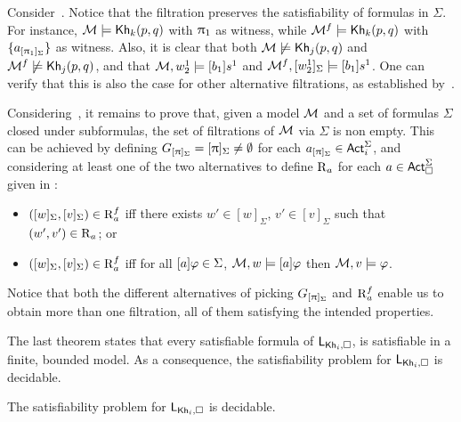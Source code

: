 \medskip 

\begin{example}\label{ex:filtration-preserves}
 Consider~. Notice that the filtration preserves the satisfiability of formulas in $\Sigma$. For instance, $\mathcal{M}\models{\sf Kh}_k(p,q)$ with $\uppi_1$ as witness, while $\mathcal{M}^f\models{\sf Kh}_k(p,q)$ with $\{ a_{[\uppi_1]_\Sigma} \}$ as witness. Also, it is clear that both $\mathcal{M}\not\models{\sf Kh}_j(p,q)$ and $\mathcal{M}^f\not\models{\sf Kh}_j(p,q)$, and that $\mathcal{M},w^1_2\models[b_1] s^1$ and $\mathcal{M}^f,[w^1_2]_\Sigma\models[b_1] s^1$. One can verify that this is also the case for other alternative filtrations, as established by~.
\end{example}

\medskip

Considering~, it remains to prove that, given a model $\mathcal{M}$ and a set of formulas $\Sigma$ closed under subformulas, the set of filtrations of $\mathcal{M}$ via $\Sigma$ is non empty.
This can be achieved by defining $G_{[\uppi]_\Sigma} = [\uppi]_\Sigma \neq \emptyset$ for each $a_{[\uppi]_\Sigma} \in {\rm \sf Act}^\Sigma_i$, and considering at least one of the two alternatives to define $\operatorname{R}_a$ for each $a \in {\rm \sf Act}^\Sigma_\square$ given in \cite{HML,mlbook}:

\begin{itemize}
\item $([w]_\Sigma,[v]_\Sigma) \in \operatorname{R}^f_a$ iff there exists $w' \in [w]_\Sigma$, $v' \in [v]_\Sigma$ such that $(w',v') \in \operatorname{R}_a$; or
\item $([w]_\Sigma,[v]_\Sigma) \in \operatorname{R}^f_a$ iff for all $[a]\varphi \in \Sigma$, $\mathcal{M},w \models [a]\varphi$ then $\mathcal{M},v \models \varphi$.
\end{itemize}

Notice that both the different alternatives of picking $G_{[\uppi]_\Sigma}$ and $\operatorname{R}^f_a$ enable us to obtain more than one filtration, all of them satisfying the intended properties.

\medskip

The last theorem states that every satisfiable formula of $\mathsf{L}_{{\sf Kh}_i,\square}$, is satisfiable in a finite, bounded model.
As a consequence, the satisfiability problem for $\mathsf{L}_{{\sf Kh}_i,\square}$ is decidable.

\medskip

\begin{corollary}\label{cor:extended-decidable}
The satisfiability problem for $\mathsf{L}_{{\sf Kh}_i,\square}$ is decidable.
\end{corollary}

